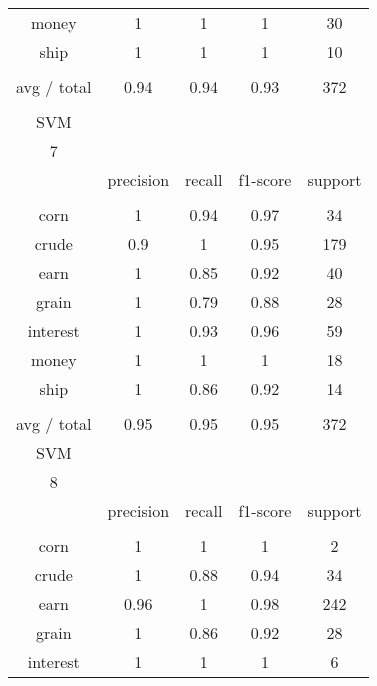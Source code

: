 \documentclass[11pt]{article}
\begin{document}
\begin{center}
\begin{longtable}{| c | c | c | c | c |}
money       & 1         & 1      & 1        & 30      \\
ship        & 1         & 1      & 1        & 10      \\
           &           &        &          &         \\
avg / total & 0.94      & 0.94   & 0.93     & 372     \\
           &           &        &          &         \\
SVM         &           &        &          &         \\
7           &           &        &          &         \\
           & precision & recall & f1-score & support \\
           &           &        &          &         \\
corn        & 1         & 0.94   & 0.97     & 34      \\
crude       & 0.9       & 1      & 0.95     & 179     \\
earn        & 1         & 0.85   & 0.92     & 40      \\
grain       & 1         & 0.79   & 0.88     & 28      \\
interest    & 1         & 0.93   & 0.96     & 59      \\
money       & 1         & 1      & 1        & 18      \\
ship        & 1         & 0.86   & 0.92     & 14      \\
           &           &        &          &         \\
avg / total & 0.95      & 0.95   & 0.95     & 372     \\
\hline
SVM         &           &        &          &         \\
8           &           &        &          &         \\
           & precision & recall & f1-score & support \\
           &           &        &          &         \\
corn        & 1         & 1      & 1        & 2       \\
crude       & 1         & 0.88   & 0.94     & 34      \\
earn        & 0.96      & 1      & 0.98     & 242     \\
grain       & 1         & 0.86   & 0.92     & 28      \\
interest    & 1         & 1      & 1        & 6       \\

\end{longtable}
\end{center}
\end{document}
